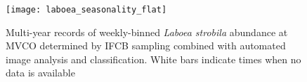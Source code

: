 \begin{figure}

\graphicspath{ {Chapter2_Figures/} }
\texttt{[image: laboea\_seasonality\_flat]}
\caption [\textit{Laboea strobila} yearly seasonality] {Multi-year records of weekly-binned \textit{Laboea strobila} abundance at MVCO determined by IFCB sampling combined with automated image analysis and classification. White bars indicate times when no data is available}
\label{arm:fig2}
\end{figure}

